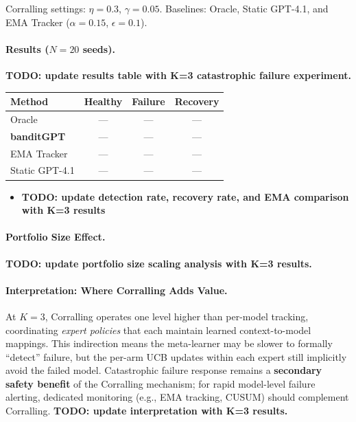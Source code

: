 Corralling settings: $\eta{=}0.3$, $\gamma{=}0.05$. Baselines: Oracle, Static GPT-4.1, and EMA Tracker ($\alpha{=}0.15$, $\epsilon{=}0.1$).

\paragraph{Results ($N{=}20$ seeds).}

\textbf{TODO: update results table with K=3 catastrophic failure experiment.}

\begin{table}[htbp]
\centering
\small
\begin{tabular}{@{}lccc@{}}
\toprule
\textbf{Method} & \textbf{Healthy} & \textbf{Failure} & \textbf{Recovery} \\
\midrule
Oracle & --- & --- & --- \\
\textbf{banditGPT} & --- & --- & --- \\
EMA Tracker & --- & --- & --- \\
Static GPT-4.1 & --- & --- & --- \\
\bottomrule
\end{tabular}
\end{table}

\begin{itemize}[nosep]
    \item \textbf{TODO: update detection rate, recovery rate, and EMA comparison with K=3 results}
\end{itemize}

\paragraph{Portfolio Size Effect.}
\textbf{TODO: update portfolio size scaling analysis with K=3 results.}

\paragraph{Interpretation: Where Corralling Adds Value.}
At $K{=}3$, Corralling operates one level higher than per-model tracking, coordinating \emph{expert policies} that each maintain learned context-to-model mappings. This indirection means the meta-learner may be slower to formally ``detect'' failure, but the per-arm UCB updates within each expert still implicitly avoid the failed model. Catastrophic failure response remains a \textbf{secondary safety benefit} of the Corralling mechanism; for rapid model-level failure alerting, dedicated monitoring (e.g., EMA tracking, CUSUM) should complement Corralling. \textbf{TODO: update interpretation with K=3 results.}

